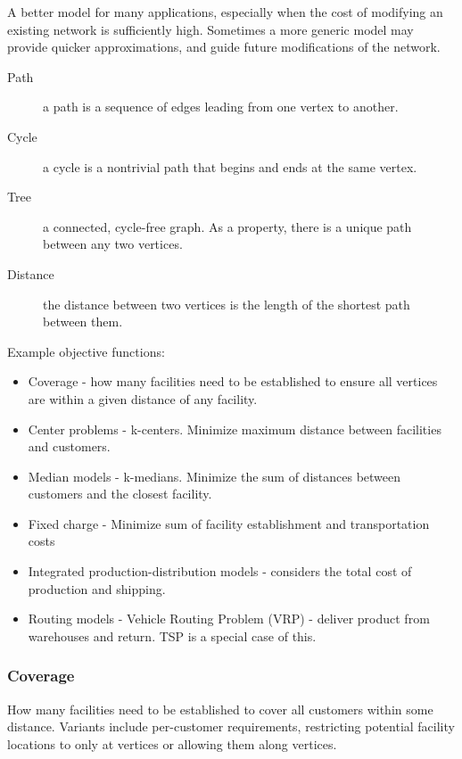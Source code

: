 \documentclass{idc_msc}
\begin{document}
A better model for many applications, especially when the cost of modifying an existing network is sufficiently high.
Sometimes a more generic model may provide quicker approximations, and guide future modifications of the network.

\begin{description}
  \item[Path] a path is a sequence of edges leading from one vertex to another.
  \item[Cycle] a cycle is a nontrivial path that begins and ends at the same vertex.
  \item[Tree] a connected, cycle-free graph. As a property, there is a unique path between any two vertices.
  \item[Distance] the distance between two vertices is the length of the shortest path between them.
\end{description}

Example objective functions:


\begin{itemize}
  \item Coverage - how many facilities need to be established to ensure all vertices are within a given distance of any facility.
  \item Center problems - k-centers. Minimize maximum distance between facilities and customers.
  \item Median models - k-medians. Minimize the sum of distances between customers and the closest facility.
  \item Fixed charge - Minimize sum of facility establishment and transportation costs
  \item Integrated production-distribution models - considers the total cost of production and shipping.
  \item Routing models - Vehicle Routing Problem (VRP) - deliver product from warehouses and return. TSP is a special case of this.
\end{itemize}

\subsubsection{Coverage}

How many facilities need to be established to cover all customers within some distance.
Variants include per-customer requirements, restricting potential facility locations to only at vertices or allowing them along vertices.
\end{document}
